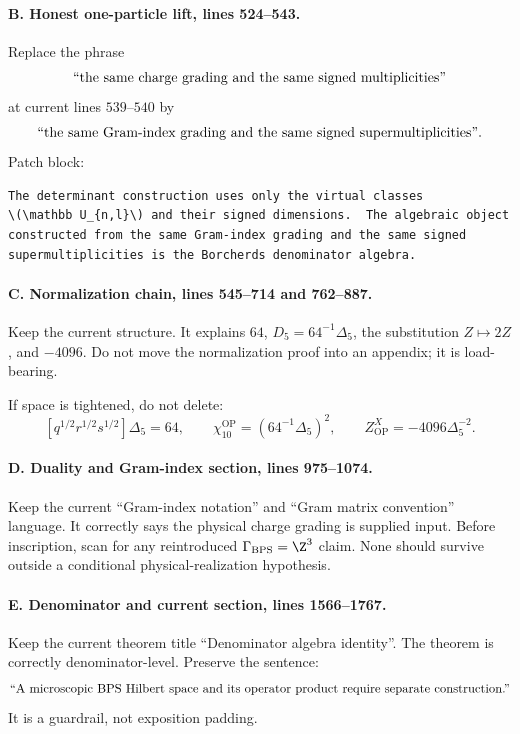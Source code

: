 \paragraph{B. Honest one-particle lift, lines 524--543.}
Replace the phrase
\[
\hbox{``the same charge grading and the same signed multiplicities''}
\]
at current lines \(539\)--\(540\) by
\[
\hbox{``the same Gram-index grading and the same signed
supermultiplicities''}.
\]
Patch block:
\begin{verbatim}
The determinant construction uses only the virtual classes
\(\mathbb U_{n,l}\) and their signed dimensions.  The algebraic object
constructed from the same Gram-index grading and the same signed
supermultiplicities is the Borcherds denominator algebra.
\end{verbatim}

\paragraph{C. Normalization chain, lines 545--714 and 762--887.}
Keep the current structure.  It explains \(64\), \(D_5=64^{-1}\Delta_5\),
the substitution \(Z\mapsto2Z\), and \(-4096\).  Do not move the
normalization proof into an appendix; it is load-bearing.

If space is tightened, do not delete:
\[
[q^{1/2}r^{1/2}s^{1/2}]\Delta_5=64,\qquad
\chi_{10}^{\mathrm{OP}}=(64^{-1}\Delta_5)^2,\qquad
Z^X_{\mathrm{OP}}=-4096\Delta_5^{-2}.
\]

\paragraph{D. Duality and Gram-index section, lines 975--1074.}
Keep the current ``Gram-index notation'' and ``Gram matrix convention''
language.  It correctly says the physical charge grading is supplied
input.  Before inscription, scan for any reintroduced
\(\Gamma_{\mathrm{BPS}}=\Z^3\) claim.  None should survive outside a
conditional physical-realization hypothesis.

\paragraph{E. Denominator and current section, lines 1566--1767.}
Keep the current theorem title ``Denominator algebra identity''.  The
theorem is correctly denominator-level.  Preserve the sentence:
\[
\hbox{``A microscopic BPS Hilbert space and its operator product require
separate construction.''}
\]
It is a guardrail, not exposition padding.

